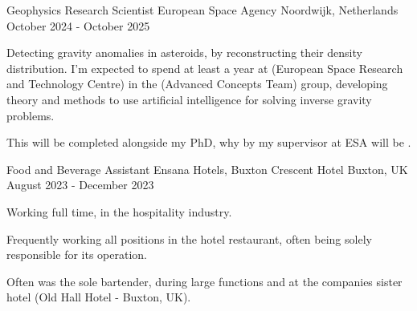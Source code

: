 

\begin{cventries}

  \cventry
    {Geophysics Research Scientist} %
    {European Space Agency} %
    {Noordwijk, Netherlands} %
    {October 2024 - October 2025} %
    {
      \begin{cvitems} %
        \item {Detecting gravity anomalies in asteroids, by reconstructing their density distribution. I’m expected to spend at least a year at \href{https://maps.app.goo.gl/VygAGAxH79ZLLgZW7}{\color{darkblue}{ESTEC}} (European Space Research and Technology Centre) in the \href{https://www.esa.int/gsp/ACT/}{\color{darkblue}{ACT}} (Advanced Concepts Team) group, developing theory and methods to use artificial intelligence for solving inverse gravity problems.  
        }
        \item {This will be completed alongside my PhD, why by my supervisor at ESA will be \href{https://www.esa.int/gsp/ACT/team/dario_izzo/}{\color{darkblue}{Dr Dario Izzo}}.}
      \end{cvitems}
    }

  \cventry
    {Food and Beverage Assistant} %
    {Ensana Hotels, Buxton Crescent Hotel} %
    {Buxton, UK} %
    {August 2023 - December 2023} %
    {
      \begin{cvitems} %
        \item {Working full time, in the hospitality industry.}
        \item {Frequently working all positions in the hotel restaurant, often being solely responsible for its operation.}
        \item{Often was the sole bartender, during large functions and at the companies sister hotel (Old Hall Hotel - Buxton, UK).}
      \end{cvitems}
    }
    

\end{cventries}
